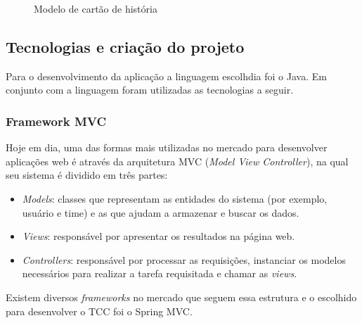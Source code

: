\begin{figure}[H]
  \hspace*{-4em}
  \caption{Modelo de cartão de história}\label{figura:cartao}
\end{figure}

\subsection{Tecnologias e criação do projeto}

Para o desenvolvimento da aplicação a linguagem escolhdia foi o Java. Em conjunto com a linguagem foram utilizadas as tecnologias a seguir.

\subsubsection*{Framework MVC}

Hoje em dia, uma das formas mais utilizadas no mercado para desenvolver aplicações web é através da arquitetura MVC (\textit{Model View Controller}), na qual seu sistema é dividido em três partes:

\begin{itemize}
	\item \textit{Models}: classes que representam as entidades do sistema (por exemplo, usuário e time) e as que ajudam a armazenar e buscar os dados.
	\item \textit{Views}: responsável por apresentar os resultados na página web.
	\item \textit{Controllers}: responsável por processar as requisições, instanciar os modelos necessários para realizar a tarefa requisitada e chamar as \textit{views}.
\end{itemize}

Existem diversos \textit{frameworks} no mercado que seguem essa estrutura e o escolhido para desenvolver o TCC foi o Spring MVC.

